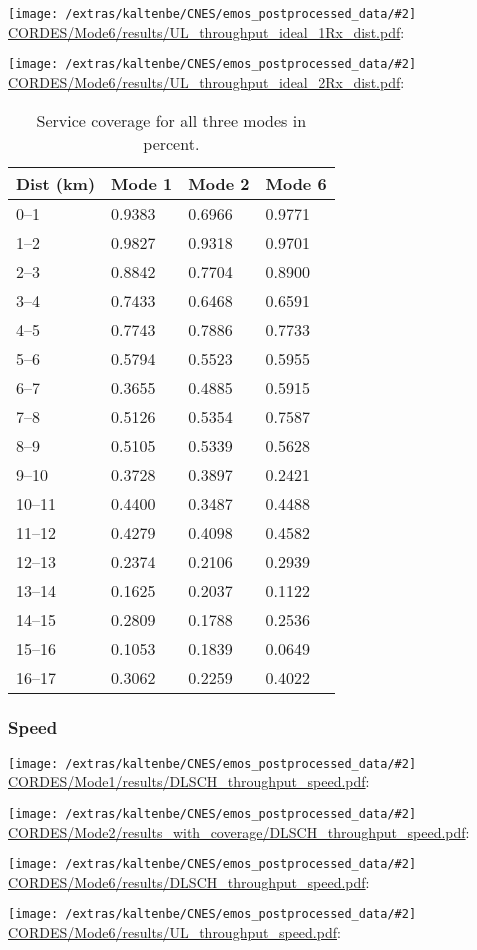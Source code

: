 \documentclass[a4paper,10pt]{article}
\newcommand{\printfile}[2][]{
 \begin{minipage}{8cm}
  \centering
  \texttt{[image: /extras/kaltenbe/CNES/emos\_postprocessed\_data/\#2]}
  \url{#2}: #1

 \end{minipage}
}
\begin{document}
\printfile{CORDES/Mode6/results/UL_throughput_ideal_1Rx_dist.pdf}
\printfile{CORDES/Mode6/results/UL_throughput_ideal_2Rx_dist.pdf}

\begin{table}
\centering
\begin{tabular}{l|l|l|l}
Dist (km) & Mode 1 & Mode 2 & Mode 6\\
\hline
0--1 &   0.9383 &   0.6966 &   0.9771\\
1--2 &   0.9827 &   0.9318 &   0.9701\\
2--3 &   0.8842 &   0.7704 &   0.8900\\
3--4 &   0.7433 &   0.6468 &   0.6591\\
4--5 &   0.7743 &   0.7886 &   0.7733\\
5--6 &   0.5794 &   0.5523 &   0.5955\\
6--7 &   0.3655 &   0.4885 &   0.5915\\
7--8 &   0.5126 &   0.5354 &   0.7587\\
8--9 &   0.5105 &   0.5339 &   0.5628\\
9--10 &    0.3728 &   0.3897 &   0.2421\\
10--11 &   0.4400 &   0.3487 &   0.4488\\
11--12 &   0.4279 &   0.4098 &   0.4582\\
12--13 &   0.2374 &   0.2106 &   0.2939\\
13--14 &   0.1625 &   0.2037 &   0.1122\\
14--15 &   0.2809 &   0.1788 &   0.2536\\
15--16 &   0.1053 &   0.1839 &   0.0649\\
16--17 &   0.3062 &   0.2259 &   0.4022\\
\end{tabular}
\caption{Service coverage for all three modes in percent.}
\end{table}

\subsubsection{Speed}

\printfile{CORDES/Mode1/results/DLSCH_throughput_speed.pdf}
\printfile{CORDES/Mode2/results_with_coverage/DLSCH_throughput_speed.pdf}

\printfile{CORDES/Mode6/results/DLSCH_throughput_speed.pdf}
\printfile{CORDES/Mode6/results/UL_throughput_speed.pdf}
\end{document}
